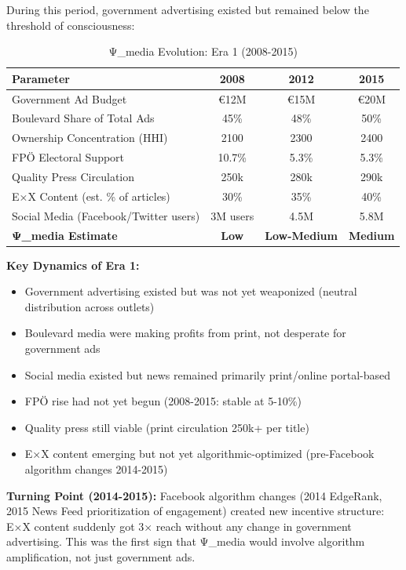 During this period, government advertising existed but remained below the threshold of consciousness:

\begin{table}[h]
\centering
\caption{Ψ_media Evolution: Era 1 (2008-2015)}
\label{tab:dx-psi-evolution-era1}
\begin{tabular}{|l|c|c|c|}
\hline
\textbf{Parameter} & \textbf{2008} & \textbf{2012} & \textbf{2015} \\
\hline
Government Ad Budget & €12M & €15M & €20M & \\
Boulevard Share of Total Ads & 45\% & 48\% & 50\% \\
Ownership Concentration (HHI) & 2100 & 2300 & 2400 \\
FPÖ Electoral Support & 10.7\% & 5.3\% & 5.3\% \\
Quality Press Circulation & 250k & 280k & 290k \\
E×X Content (est. \% of articles) & 30\% & 35\% & 40\% \\
Social Media (Facebook/Twitter users) & 3M users & 4.5M & 5.8M \\
\hline
\textbf{Ψ_media Estimate} & \textbf{Low} & \textbf{Low-Medium} & \textbf{Medium} \\
\hline
\end{tabular}
\end{table}

\textbf{Key Dynamics of Era 1:}

\begin{itemize}
\item Government advertising existed but was not yet weaponized (neutral distribution across outlets)
\item Boulevard media were making profits from print, not desperate for government ads
\item Social media existed but news remained primarily print/online portal-based
\item FPÖ rise had not yet begun (2008-2015: stable at 5-10\%)
\item Quality press still viable (print circulation 250k+ per title)
\item E×X content emerging but not yet algorithmic-optimized (pre-Facebook algorithm changes 2014-2015)
\end{itemize}

\textbf{Turning Point (2014-2015):} Facebook algorithm changes (2014 EdgeRank, 2015 News Feed prioritization
of engagement) created new incentive structure: E×X content suddenly got 3× reach without any change in
government advertising. This was the first sign that Ψ_media would involve algorithm amplification, not
just government ads.

